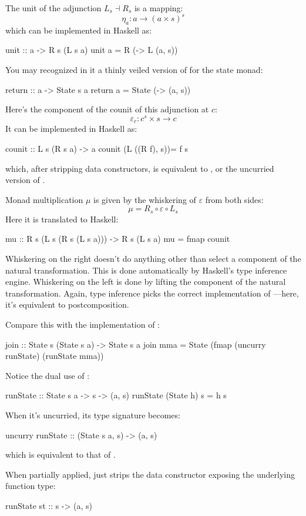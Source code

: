 \documentclass[DaoFP]{subfiles}
\begin{document}
The unit of the adjunction $L_s \dashv R_s$ is a mapping:
\[ \eta_a \colon a \to (a \times s)^s \]
which can be implemented in Haskell as:
\begin{haskell}
unit :: a -> R s (L s a)
unit a = R (\s -> L (a, s))
\end{haskell}
You may recognized in it a thinly veiled version of  for the state monad:
\begin{haskell}
return :: a -> State s a
return a = State (\s -> (a, s))
\end{haskell}

Here's the component of the counit of this adjunction at $c$:
\[ \varepsilon_c \colon c^s \times s \to c \]
It can be implemented in Haskell as:
\begin{haskell}
counit :: L s (R s a) -> a
counit (L ((R f), s))= f s
\end{haskell}
which, after stripping data constructors, is equivalent to , or the uncurried version of .

Monad multiplication $\mu$ is given by the whiskering of $\varepsilon$ from both sides:
\[ \mu = R_s \circ \varepsilon \circ L_s \]
Here it is translated to Haskell:
\begin{haskell}
mu :: R s (L s (R s (L s a))) -> R s (L s a)
mu = fmap counit
\end{haskell}
Whiskering on the right doesn't do anything other than select a component of the natural transformation. This is done automatically by Haskell's type inference engine. Whiskering on the left is done by lifting the component of the natural transformation. Again, type inference picks the correct implementation of ---here, it's equivalent to postcomposition.

Compare this with the implementation of :
\begin{haskell}
join :: State s (State s a) -> State s a
join mma = State (fmap (uncurry runState) (runState mma))
\end{haskell}
Notice the dual use of : 
\begin{haskell}
runState :: State s a -> s -> (a, s)
runState (State h) s = h s
\end{haskell}
When it's uncurried, its type signature becomes:
\begin{haskell}
uncurry runState :: (State s a, s) -> (a, s)
\end{haskell}
which is equivalent to that of . 

When partially applied,  just strips the data constructor exposing the underlying function type:
\begin{haskell}
runState st :: s -> (a, s)
\end{haskell}
\end{document}
